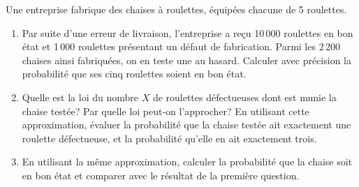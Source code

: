 \documentclass[a4paper,12pt,reqno]{amsart}
\begin{document}
\begin{exo}

  Une entreprise fabrique des chaises à roulettes, équipées chacune de 5 roulettes.

  \begin{enumerate}
    \item Par suite d'une erreur de livraison, l'entreprise a reçu 10\,000 roulettes en bon état et 1\,000 roulettes présentant un défaut de fabrication. Parmi les 2\,200 chaises ainsi fabriquées, on en teste une au hasard. Calculer avec précision la probabilité que ses cinq roulettes soient en bon état.
    \item Quelle est la loi du nombre $ X $ de roulettes défectueuses dont est munie la chaise testée? Par quelle loi peut-on l'approcher? En utilisant cette approximation, évaluer la probabilité que la chaise testée ait exactement une roulette défectueuse, et la probabilité qu'elle en ait exactement trois.
    \item En utilisant la même approximation, calculer la probabilité que la chaise soit en bon état et comparer avec le résultat de la première question.
  \end{enumerate}

\end{exo}
\end{document}
